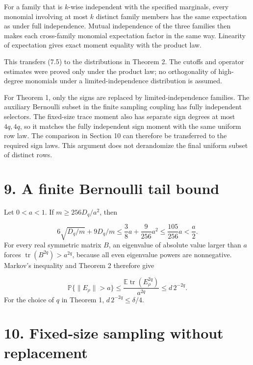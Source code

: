 \documentclass[11pt,a4paper]{article}
\begin{document}
For a family that is \(k\)-wise independent with the specified marginals, every monomial involving at most \(k\) distinct family members has the same expectation as under full independence. Mutual independence of the three families then makes each cross-family monomial expectation factor in the same way. Linearity of expectation gives exact moment equality with the product law.

This transfers (7.5) to the distributions in Theorem 2. The cutoffs and operator estimates were proved only under the product law; no orthogonality of high-degree monomials under a limited-independence distribution is assumed.

For Theorem 1, only the signs are replaced by limited-independence families. The auxiliary Bernoulli subset in the finite sampling coupling has fully independent selectors. The fixed-size trace moment also has separate sign degrees at most \(4q,4q\), so it matches the fully independent sign moment with the same uniform row law. The comparison in Section 10 can therefore be transferred to the required sign laws. This argument does not derandomize the final uniform subset of distinct rows.

\section*{9. A finite Bernoulli tail bound}
Let \(0<a<1\). If \(m\ge256D_q/a^2\), then

\begin{equation}
6\sqrt{D_q/m}+9D_q/m
\le\frac38a+\frac9{256}a^2
\le\frac{105}{256}a<\frac a2.
\tag{9.1}
\end{equation}
For every real symmetric matrix \(B\), an eigenvalue of absolute value larger than \(a\) forces \(\operatorname{tr}(B^{2q})>a^{2q}\), because all even eigenvalue powers are nonnegative. Markov's inequality and Theorem 2 therefore give

\begin{equation}
\mathbb P\{\|E_\rho\|>a\}
\le\frac{\mathbb E\operatorname{tr}(E_\rho^{2q})}{a^{2q}}
\le d\,2^{-2q}.
\tag{9.2}
\end{equation}
For the choice of \(q\) in Theorem 1, \(d\,2^{-2q}\le\delta/4\).

\section*{10. Fixed-size sampling without replacement}
\end{document}
